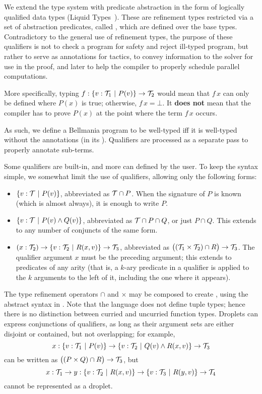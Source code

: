 We extend the type system with predicate abstraction in the form of logically qualified data types 
(Liquid Types~\cite{PLDI08/Rondon}). These are refinement types restricted via a set of abstraction predicates,
called , which are defined over the base types.
Contradictory to the general use of refinement types, the purpose of these qualifiers is not to
check a program for safety and reject ill-typed program, but rather to serve as annotations for
tactics, to convey information to the solver for use in the proof, and later to help the compiler
to properly schedule parallel computations.

More specifically, typing $f : \{v:\mathcal{T}_1 ~|~ P(v)\}\to\mathcal{T}_2$ would mean that $f\,x$
can only be defined where $P(x)$ is true; otherwise, $f\,x=\bot$. 
It {\bf does not} mean that the compiler has to prove $P(x)$ at the point where the term $f\,x$
occurs.

As such, we define a Bellmania program to be well-typed iff it is well-typed
without the annotations (in its ). Qualifiers are processed
as a separate pass to properly annotate sub-terms.

Some qualifiers are built-in, and more can defined by the user. To keep the syntax simple, we somewhat
limit the use of qualifiers, allowing only the following forms:

\begin{itemize}
  \item $\{v:\mathcal{T} ~|~ P(v)\}$, abbreviated as $\mathcal{T}\cap P$. When the signature of $P$ is known (which is
  almost always), it is enough to write $P$.
  \item $\{v:\mathcal{T} ~|~ P(v)\land Q(v)\}$, abbreviated as $\mathcal{T}\cap P\cap Q$, or just $P\cap Q$. This extends
  to any number of conjuncts of the same form.
  \item $(x : \mathcal{T}_2) \to \{v:\mathcal{T}_2 ~|~ R(x,v)\} \to \mathcal{T}_3$, abbreviated as $\big((\mathcal{T}_1\times\mathcal{T}_2)\cap R\big)\to\mathcal{T}_3$.
  The qualifier argument $x$ must be the preceding argument; this extends to predicates of
  any arity (that is, a $k$-ary predicate in a qualifier is applied to the $k$
  arguments to the left of it, including the one where it appears).
\end{itemize}


\medskip  
The type refinement operators $\cap$ and $\times$ may be composed to create ,
using the abstract syntax in .
Note that the language does not define tuple types; hence there is no distinction between curried and uncurried function types.
Droplets can express conjunctions of qualifiers,
as long as their argument sets are either disjoint or contained, but not overlapping;
for example, \[x:\{v:\mathcal{T}_1~|~P(v)\}\to \{v:\mathcal{T}_2~|~Q(v)\land R(x,v)\}\to\mathcal{T}_3\] can be written as
$\big((P\times Q)\cap R\big)\to\mathcal{T}_3$, but \[x:\mathcal{T}_1\to y:\{v:\mathcal{T}_2~|~R(x,v)\} \to \{v:\mathcal{T}_3~|~R(y,v)\}\to\mathcal{T}_4\]
cannot be represented as a droplet.

